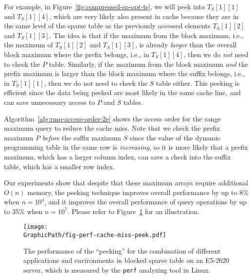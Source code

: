 For example, in Figure~\ref{fig:compressed-sp-opt-ts}, we will peek into
$T_{S}[1][1]$ and $T_{S}[1][4]$, which are very likely also present in
cache because they are in the same level of the sparse table as the
previously accessed elements $T_{S}[1][2]$ and $T_{S}[1][3]$.  The idea
is that if the maximum from the block maximum, i.e., the maximum of
$T_{S}[1][2]$ and $T_{S}[1][3]$, is already {\em larger} than the
overall block maximum where the prefix belongs, i.e., in
$T_{S}[1][4]$, then we do {\em not} need to check the $P$ table.
Similarly, if the maximum from the block maximum {\em and} the prefix
maximum is larger than the block maximum where the suffix belongs,
i.e., in $T_{S}[1][1]$, then we do not need to check the $S$ table
either.  This peeking is efficient since the data being peeked are
most likely in the same cache line, and can save unnecessary access to
$P$ and $S$ tables.

Algorithm~\ref{alg:rmq-access-order-2e} shows the access order for the
range maximum query to reduce the cache miss.  Note that we check the
prefix maximum $P$ {\em before} the suffix maximum $S$ since the value
of the dynamic programming table in the same row is {\em increasing},
so it is more likely that a prefix maximum, which has a larger column
index, can save a check into the suffix table, which has a smaller row
index.

Our experiments show that despite that these maximum arrays require
additional $O(n)$ memory, the peeking technique improves overall
performance by up to 8\% when $n = 10^4$, and it improves the overall
performance of query operations by up to 35\% when $n = 10^7$.  Please
refer to Figure~\ref{fig:fig-perf-cache-miss-peek} for an illustration.

\begin{figure}
  \centering
  \texttt{[image: \\GraphicPath/fig-perf-cache-miss-peek.pdf]}
  \caption{The performance of the ``peeking'' for
  the combination of different applications and environments in blocked
  sparse table on an E5-2620 server, which is measured by the {\tt perf}
  analyzing tool in Linux.}
  \label{fig:fig-perf-cache-miss-peek}
\end{figure}




